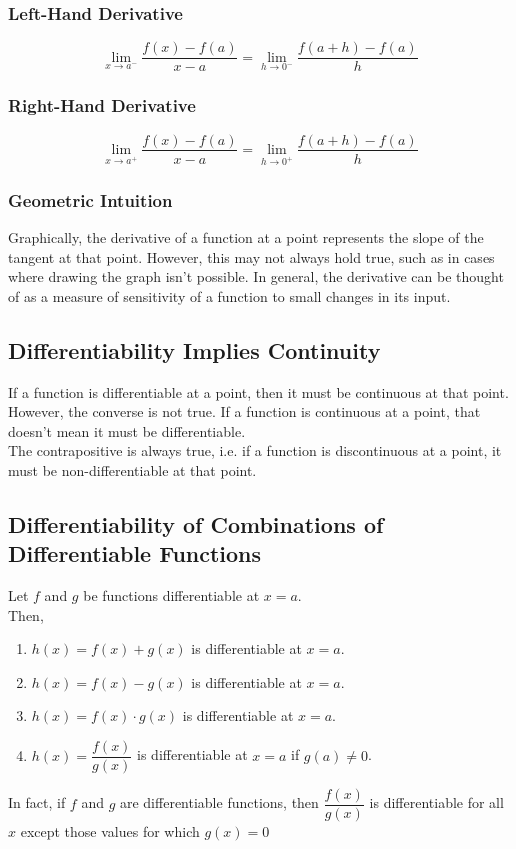 \documentclass[14]{article}
\theoremstyle{definition}
\theoremstyle{case}
\begin{document}
\subsubsection{Left-Hand Derivative}
\[\lim\limits_{x \to a^-} \dfrac{f(x) - f(a)}{x-a} = \lim\limits_{h \to 0^-} \dfrac{f(a + h) - f(a)}{h} \]
\subsubsection{Right-Hand Derivative}
\[\lim\limits_{x \to a^+} \dfrac{f(x) - f(a)}{x-a} = \lim\limits_{h \to 0^+} \dfrac{f(a + h) - f(a)}{h} \]
\subsubsection{Geometric Intuition}
Graphically, the derivative of a function at a point represents the slope of the tangent at that point. However, this may not always hold true, such as in cases where drawing the graph isn't possible. In general, the derivative can be thought of as a measure of sensitivity of a function to small changes in its input.
\subsection{Differentiability Implies Continuity}
If a function is differentiable at a point, then it must be continuous at that point.\\
However, the converse is not true. If a function is continuous at a point, that doesn't mean it must be differentiable.\\
The contrapositive is always true, i.e. if a function is discontinuous at a point, it must be non-differentiable at that point.
\subsection{Differentiability of Combinations of Differentiable Functions}
Let $f$ and $g$ be functions differentiable at $x = a$.\\
Then,\\
\begin{enumerate}
\item $h(x) = f(x) + g(x)$ is differentiable at $x = a$.
\item $h(x) = f(x) - g(x)$ is differentiable at $x = a$.
\item $h(x) = f(x) \cdot g(x)$ is differentiable at $x = a$.
\item $h(x) =\dfrac{f(x)}{g(x)}$ is differentiable at $x = a$ if $g(a) \neq 0$.
\end{enumerate}
In fact, if $f$ and $g$ are differentiable functions, then $\dfrac{f(x)}{g(x)}$ is differentiable for all $x$ except those values for which $g(x)=0$
\pagebreak
\end{document}
